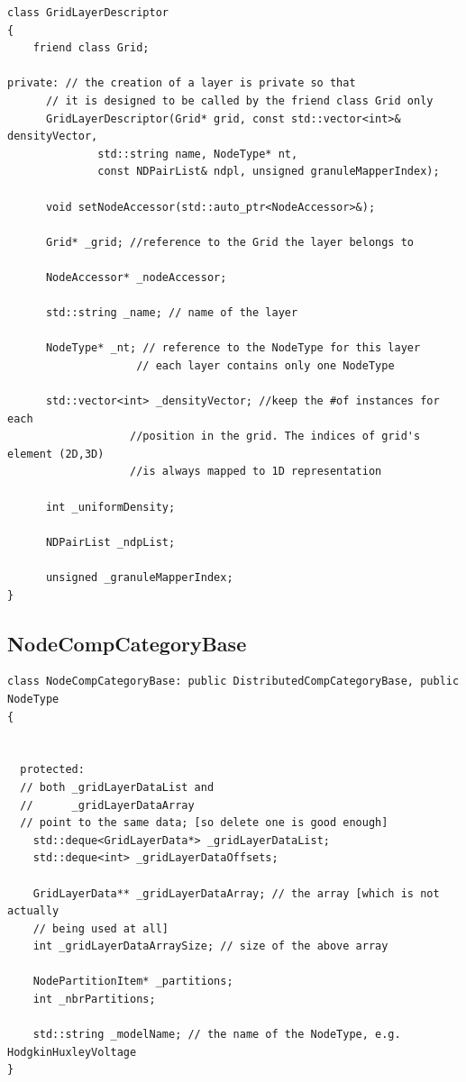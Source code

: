 {\small
\begin{lstlisting}
class GridLayerDescriptor
{
    friend class Grid;
    
private: // the creation of a layer is private so that
	  // it is designed to be called by the friend class Grid only
      GridLayerDescriptor(Grid* grid, const std::vector<int>& densityVector, 
			  std::string name, NodeType* nt, 
			  const NDPairList& ndpl, unsigned granuleMapperIndex);

      void setNodeAccessor(std::auto_ptr<NodeAccessor>&);

      Grid* _grid; //reference to the Grid the layer belongs to
      
      NodeAccessor* _nodeAccessor;
      
      std::string _name; // name of the layer
      
      NodeType* _nt; // reference to the NodeType for this layer
                    // each layer contains only one NodeType
      
      std::vector<int> _densityVector; //keep the #of instances for each
                   //position in the grid. The indices of grid's element (2D,3D)
                   //is always mapped to 1D representation
      
      int _uniformDensity;
      
      NDPairList _ndpList;
      
      unsigned _granuleMapperIndex;
}
\end{lstlisting}
}


\subsection{NodeCompCategoryBase}
\label{sec:NodeCompCategoryBase}

\begin{lstlisting}
class NodeCompCategoryBase: public DistributedCompCategoryBase, public NodeType
{
  
  
  protected:
  // both _gridLayerDataList and
  //      _gridLayerDataArray
  // point to the same data; [so delete one is good enough]
    std::deque<GridLayerData*> _gridLayerDataList;
    std::deque<int> _gridLayerDataOffsets;
  
    GridLayerData** _gridLayerDataArray; // the array [which is not actually
    // being used at all]
    int _gridLayerDataArraySize; // size of the above array
    
    NodePartitionItem* _partitions;
    int _nbrPartitions;
    
    std::string _modelName; // the name of the NodeType, e.g. HodgkinHuxleyVoltage
}
\end{lstlisting}

